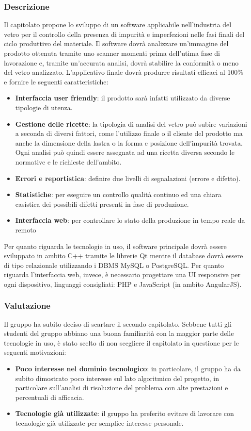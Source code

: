 \subsubsection{Descrizione}
Il capitolato propone lo sviluppo di un software applicabile nell'industria del vetro per il controllo della presenza di impurità e imperfezioni nelle fasi finali del ciclo produttivo del materiale. Il software dovrà analizzare un'immagine del prodotto ottenuta tramite uno scanner momenti prima dell'utima fase di lavorazione e, tramite un'accurata analisi, dovrà stabilire la conformità o meno del vetro analizzato. L'applicativo finale dovrà produrre risultati efficaci al 100\% e fornire le seguenti caratteristiche:
\begin{itemize}
\item \textbf{Interfaccia user friendly}: il prodotto sarà infatti utilizzato da diverse tipologie di utenza.
\item \textbf{Gestione delle ricette}: la tipologia di analisi del vetro può subire variazioni a seconda di diversi fattori, come l'utilizzo finale o il cliente del prodotto ma anche la dimensione della lastra o la forma e posizione dell'impurità trovata. Ogni analisi può quindi essere assegnata ad una ricetta diversa secondo le normative e le richieste dell'ambito.
\item \textbf{Errori e reportistica}: definire due livelli di segnalazioni (errore e difetto).
\item \textbf{Statistiche}: per eseguire un controllo qualità continuo ed una chiara casistica dei possibili difetti presenti in fase di produzione.
\item \textbf{Interfaccia web}: per controllare lo stato della produzione in tempo reale da remoto
\end{itemize} 
Per quanto riguarda le tecnologie in uso, il software principale dovrà essere sviluppato in ambito C++ tramite le librerie Qt mentre il database dovrà essere di tipo relazionale utilizzando i DBMS MySQL o PostgreSQL. Per quanto riguarda l'interfaccia web, invece, è necessario progettare una UI responsive per ogni dispositivo, linguaggi consigliati: PHP e JavaScript (in ambito AngularJS). 

\subsubsection{Valutazione}
Il gruppo ha subito deciso di scartare il secondo capitolato. Sebbene tutti gli studenti del gruppo abbiano una buona familiarità con la maggior parte delle tecnologie in uso, è stato scelto di non scegliere il capitolato in questione per le seguenti motivazioni:
\begin{itemize}
\item \textbf{Poco interesse nel dominio tecnologico}: in particolare, il gruppo ha da subito dimostrato poco interesse sul lato algoritmico del progetto, in particolare sull'analisi di risoluzione del problema con alte prestazioni e percentuali di afficacia.
\item \textbf{Tecnologie già utilizzate}: il gruppo ha preferito evitare di lavorare con tecnologie già utilizzate per semplice interesse personale.
\end{itemize}

